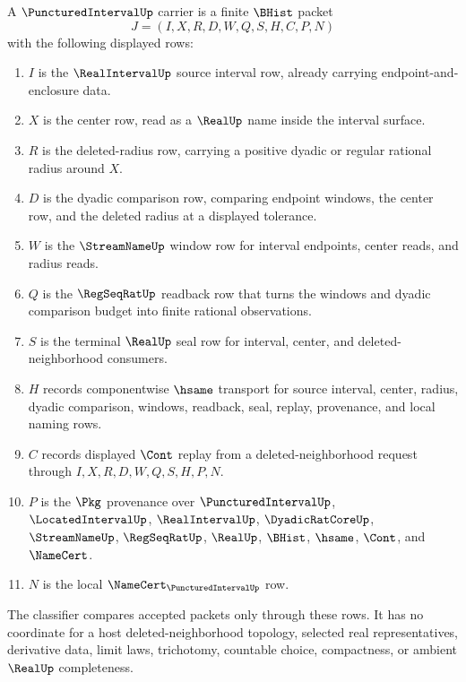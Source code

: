 \begin{definition}\label{def:punctured-interval-carrier}
A $\PuncturedIntervalUp$ carrier is a finite $\BHist$ packet
$$
J=(I,X,R,D,W,Q,S,H,C,P,N)
$$
with the following displayed rows:
\begin{enumerate}
\item $I$ is the $\RealIntervalUp$ source interval row, already carrying endpoint-and-enclosure data.
\item $X$ is the center row, read as a $\RealUp$ name inside the interval surface.
\item $R$ is the deleted-radius row, carrying a positive dyadic or regular rational radius around $X$.
\item $D$ is the dyadic comparison row, comparing endpoint windows, the center row, and the deleted radius at a displayed tolerance.
\item $W$ is the $\StreamNameUp$ window row for interval endpoints, center reads, and radius reads.
\item $Q$ is the $\RegSeqRatUp$ readback row that turns the windows and dyadic comparison budget into finite rational observations.
\item $S$ is the terminal $\RealUp$ seal row for interval, center, and deleted-neighborhood consumers.
\item $H$ records componentwise $\hsame$ transport for source interval, center, radius, dyadic comparison, windows, readback, seal, replay, provenance, and local naming rows.
\item $C$ records displayed $\Cont$ replay from a deleted-neighborhood request through $I,X,R,D,W,Q,S,H,P,N$.
\item $P$ is the $\Pkg$ provenance over $\PuncturedIntervalUp$, $\LocatedIntervalUp$, $\RealIntervalUp$, $\DyadicRatCoreUp$, $\StreamNameUp$, $\RegSeqRatUp$, $\RealUp$, $\BHist$, $\hsame$, $\Cont$, and $\NameCert$.
\item $N$ is the local $\NameCert_{\PuncturedIntervalUp}$ row.
\end{enumerate}
The classifier compares accepted packets only through these rows. It has no coordinate for a host deleted-neighborhood topology, selected real representatives, derivative data, limit laws, trichotomy, countable choice, compactness, or ambient $\RealUp$ completeness.
\end{definition}

